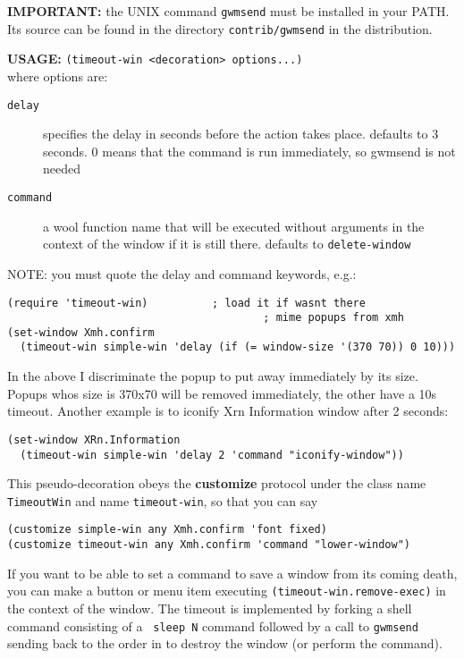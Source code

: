 {\bf IMPORTANT:} the UNIX command {\tt gwmsend} must be installed in your
PATH. Its source can be found in the directory {\tt contrib/gwmsend} in the
{\GWM} distribution.

{\bf USAGE:} {\tt (timeout-win <decoration> options...) }\\
where options are:
\begin{description}
\item[{\tt delay}] specifies the delay in seconds before the action takes
                 place. defaults to 3 seconds. 0 means that the command
                 is run immediately, so gwmsend is not needed
\item[{\tt command}] a wool function name that will be executed without
                 arguments in the context of the window if it is still 
                 there. defaults to {\tt delete-window}
\end{description}

NOTE: you must quote the delay and command keywords, e.g.:
{\exemplefont\begin{verbatim}
(require 'timeout-win)			; load it if wasnt there
                                        ; mime popups from xmh
(set-window Xmh.confirm 
  (timeout-win simple-win 'delay (if (= window-size '(370 70)) 0 10)))
\end{verbatim}}

In the above I discriminate the popup to put away immediately by its
size. Popups whos size is 370x70 will be removed immediately, 
the other have a 10s timeout. Another example is to iconify Xrn Information 
window after 2 seconds:
{\exemplefont\begin{verbatim}
(set-window XRn.Information
  (timeout-win simple-win 'delay 2 'command "iconify-window"))
\end{verbatim}}

This pseudo-decoration obeys the {\bf customize} protocol under the class name
{\tt TimeoutWin} and name {\tt timeout-win}, so that you can say 
{\exemplefont\begin{verbatim}
(customize simple-win any Xmh.confirm 'font fixed)
(customize timeout-win any Xmh.confirm 'command "lower-window")
\end{verbatim}}

If you want to be able to set a command to save a window from its coming 
death, you can make a button or menu item executing 
{\tt (timeout-win.remove-exec)} in the context of the window.
The timeout is implemented by forking a shell command consisting of a {\tt
sleep N} command followed by a call to {\tt gwmsend} sending back to {\GWM}
the order in {\WOOL} to destroy the window (or perform the command).


